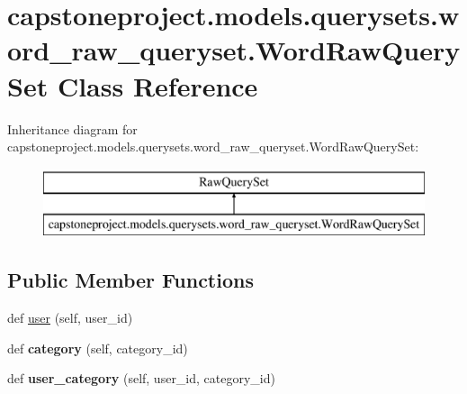 \hypertarget{classcapstoneproject_1_1models_1_1querysets_1_1word__raw__queryset_1_1_word_raw_query_set}{}\section{capstoneproject.\+models.\+querysets.\+word\+\_\+raw\+\_\+queryset.\+Word\+Raw\+Query\+Set Class Reference}
\label{classcapstoneproject_1_1models_1_1querysets_1_1word__raw__queryset_1_1_word_raw_query_set}
Inheritance diagram for capstoneproject.\+models.\+querysets.\+word\+\_\+raw\+\_\+queryset.\+Word\+Raw\+Query\+Set\+:\begin{figure}[H]
\begin{center}
\leavevmode
\includegraphics[height=2.000000cm]{classcapstoneproject_1_1models_1_1querysets_1_1word__raw__queryset_1_1_word_raw_query_set}
\end{center}
\end{figure}
\subsection*{Public Member Functions}
\begin{DoxyCompactItemize}
\item 
def \mbox{\hyperlink{classcapstoneproject_1_1models_1_1querysets_1_1word__raw__queryset_1_1_word_raw_query_set_a806224d9d71601d452952e2be6e443ad}{user}} (self, user\+\_\+id)
\item 
\mbox{\label{classcapstoneproject_1_1models_1_1querysets_1_1word__raw__queryset_1_1_word_raw_query_set_ab44422ae4461119c0c79ae04dd6e2997}} 
def {\bfseries category} (self, category\+\_\+id)
\item 
\mbox{\label{classcapstoneproject_1_1models_1_1querysets_1_1word__raw__queryset_1_1_word_raw_query_set_ad3b9ec51fc5ac0d7c59acbf83589867c}} 
def {\bfseries user\+\_\+category} (self, user\+\_\+id, category\+\_\+id)
\end{DoxyCompactItemize}


